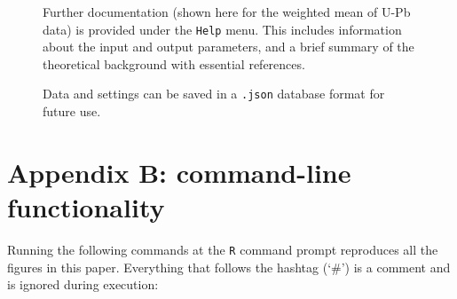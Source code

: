 \documentclass{article}
\begin{document}
\begin{figure}[!ht]
  \centering
  \label{fig:help}
  \caption{Further documentation (shown here for the weighted mean of
    U-Pb data) is provided under the \texttt{Help} menu. This includes
    information about the input and output parameters, and a brief
    summary of the theoretical background with essential references.}
\end{figure}

\begin{figure}[!ht]
  \centering
  \label{fig:json}
  \caption{Data and settings can be saved in a \texttt{.json} database
    format for future use.}
\end{figure}

\section*{Appendix B: command-line functionality}

Running the following commands at the \texttt{R} command prompt
reproduces all the figures in this paper. Everything that follows the
hashtag (`\#') is a comment and is ignored during execution:
\end{document}
